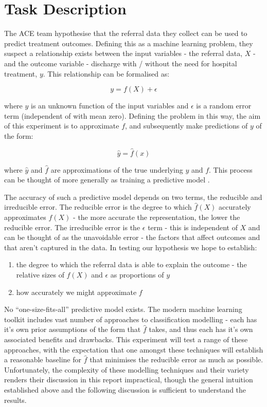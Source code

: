 \section{Task Description}\label{sec:task-description}

The ACE team hypothesise that the referral data they collect can be used to predict treatment outcomes. Defining this as a machine learning problem, they suspect a relationship exists between the input variables - the referral data, $X$ - and the outcome variable - discharge with / without the need for hospital treatment, $y$. This relationship can be formalised as:

\begin{equation}
    y = f(X) + \epsilon\label{eq:equation}
\end{equation}

where $y$ is an unknown function of the input variables and $\epsilon$ is a random error term (independent of  with mean zero). Defining the problem in this way, the aim of this experiment is to approximate $f$, and subsequently make predictions of $y$ of the form:

\begin{equation}
    \hat{y} = \hat{f}(x)
\end{equation}

where $\hat{y}$ and $\hat{f}$ are approximations of the true underlying $y$ and $f$. This process can be thought of more generally as training a predictive model \cite{islr}.

The accuracy of such a predictive model depends on two terms, the reducible and irreducible error. The reducible error is the degree to which $\hat{f}(X)$ accurately approximates $f(X)$ - the more accurate the representation, the lower the reducible error. The irreducible error is the $\epsilon$ term - this is independent of $X$ and can be thought of as the unavoidable error - the factors that affect outcomes and that aren't captured in the data. In testing our hypothesis we hope to establish:

\begin{enumerate}
    \item the degree to which the referral data is able to explain the outcome - the relative sizes of $f(X)$ and $\epsilon$ as proportions of $y$
    \item how accurately we might approximate $f$
\end{enumerate}

No ``one-size-fits-all'' predictive model exists. The modern machine learning toolkit includes vast number of approaches to classification modelling - each has it's own prior assumptions of the form that $\hat{f}$ takes, and thus each has it's own associated benefits and drawbacks. This experiment will test a range of these approaches, with the expectation that one amongst these techniques will establish a reasonable baseline for $\hat{f}$ that minimises the reducible error as much as possible. Unfortunately, the complexity of these modelling techniques and their variety renders their discussion in this report impractical, though the general intuition established above and the following discussion is sufficient to understand the results.

